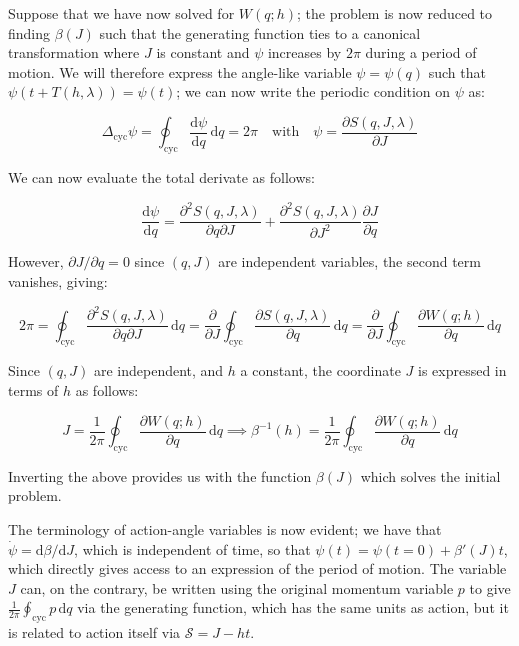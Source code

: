 Suppose that we have now solved for $W(q;h)$; the problem is now reduced to finding $\beta(J)$ such that the generating function ties to a canonical transformation where $J$ is constant and $\psi$ increases by $2\pi$ during a period of motion. We will therefore express the angle-like variable $\psi=\psi(q)$ such that $\psi(t+T(h,\lambda))=\psi(t)$; we can now write the periodic condition on $\psi$ as:

\begin{equation*}
    \Delta_\text{cyc}\psi=\oint_\text{cyc}\frac{\mathrm{d}\psi}{\mathrm{d}q}\,\mathrm{d}q=2\pi\quad\text{with}\quad\psi=\frac{\partial S(q,J,\lambda)}{\partial J}
\end{equation*}

We can now evaluate the total derivate as follows:

\begin{equation*}
    \frac{\mathrm{d}\psi}{\mathrm{d}q}=\frac{\partial^2 S(q,J,\lambda)}{\partial q\partial J}+\frac{\partial^2 S(q,J,\lambda)}{\partial J^2}\frac{\partial J}{\partial q}
\end{equation*}

However, $\partial J/\partial q=0$ since $(q,J)$ are independent variables, the second term vanishes, giving:

\begin{equation*}
    2\pi=\oint_\text{cyc}\frac{\partial^2 S(q,J,\lambda)}{\partial q\partial J}\,\mathrm{d}q=\frac{\partial}{\partial J}\oint_\text{cyc}\frac{\partial S(q,J,\lambda)}{\partial q}\,\mathrm{d}q=\frac{\partial }{\partial J}\oint_\text{cyc}\frac{\partial W(q;h)}{\partial q}\,\mathrm{d}q
\end{equation*}

Since $(q,J)$ are independent, and $h$ a constant, the coordinate $J$ is expressed in terms of $h$ as follows:

\begin{equation}
    J=\frac{1}{2\pi}\oint_\text{cyc}\frac{\partial W(q;h)}{\partial q}\,\mathrm{d}q\implies \beta^{-1}(h)=\frac{1}{2\pi}\oint_\text{cyc}\frac{\partial W(q;h)}{\partial q}\,\mathrm{d}q
\end{equation}

Inverting the above provides us with the function $\beta(J)$ which solves the initial problem.

\vspace*{2.5pt}

\quad The terminology of action-angle variables is now evident; we have that $\dot{\psi}=\mathrm{d}\beta/\mathrm{d}J$, which is independent of time, so that $\psi(t)=\psi(t=0)+\beta'(J)t$, which directly gives access to an expression of the period of motion. The variable $J$ can, on the contrary, be written using the original momentum variable $p$ to give $\frac{1}{2\pi}\oint_\text{cyc}p\,\mathrm{d}q$ via the generating function, which has the same units as action, but it is related to action itself via $\mathcal{S}=J-ht$.

